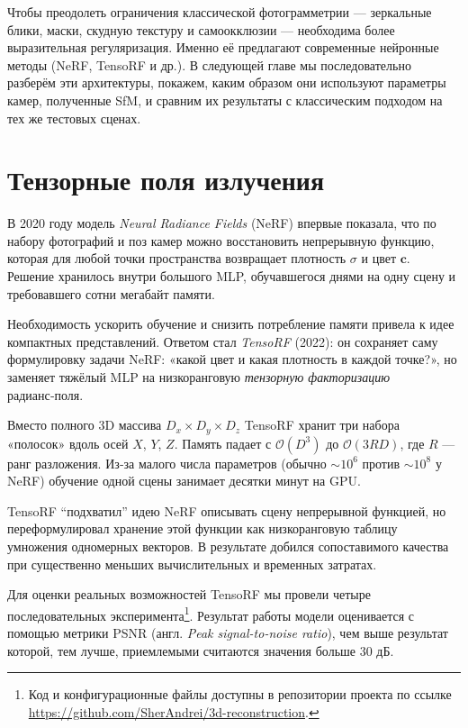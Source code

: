 \noindent Чтобы преодолеть ограничения классической фотограмметрии — зеркальные
блики, маски, скудную текстуру и самоокклюзии — необходима более выразительная
регуляризация. Именно её предлагают современные нейронные методы (NeRF, TensoRF
и др.). В следующей главе мы последовательно разберём эти архитектуры, покажем,
каким образом они используют параметры камер, полученные SfM, и сравним их
результаты с классическим подходом на тех же тестовых сценах.

\section{Тензорные поля излучения}

В 2020 году модель \emph{Neural Radiance Fields} (NeRF) впервые показала, что по
набору фотографий и поз камер можно восстановить непрерывную функцию, которая
для любой точки пространства возвращает плотность $\sigma$ и цвет $\mathbf{c}$.
Решение хранилось внутри большого MLP, обучавшегося днями на одну сцену и
требовавшего сотни мегабайт памяти.

Необходимость ускорить обучение и снизить потребление памяти
привела к идее компактных представлений.
Ответом стал \emph{TensoRF} (2022):
он сохраняет саму формулировку задачи NeRF: «какой цвет и какая плотность
в каждой точке?», но заменяет тяжёлый MLP на низкоранговую
\emph{тензорную факторизацию} радианс‑поля.

Вместо полного 3D массива $D_x\times D_y\times D_z$ TensoRF хранит три набора
«полосок» вдоль осей $X$, $Y$, $Z$.  Память падает с $\mathcal{O}(D^3)$ до
$\mathcal{O}(3RD)$, где $R$ — ранг разложения. Из‑за малого числа параметров
(обычно $\sim10^6$ против $\sim10^8$ у NeRF) обучение одной сцены занимает
десятки минут на GPU.

TensoRF ``подхватил'' идею NeRF описывать сцену непрерывной функцией, но
переформулировал хранение этой функции как низкоранговую таблицу умножения
одномерных векторов.  В результате добился сопоставимого качества при
существенно меньших вычислительных и временных затратах.

Для оценки реальных возможностей TensoRF мы провели
четыре последовательных эксперимента\footnote{Код
и конфигурационные файлы доступны в репозитории проекта по ссылке \url{https://github.com/SherAndrei/3d-reconstruction}.}.
Результат работы модели оценивается с помощью метрики PSNR (англ. \emph{Peak signal-to-noise ratio}),
чем выше результат которой, тем лучше, приемлемыми считаются значения больше 30 дБ.

